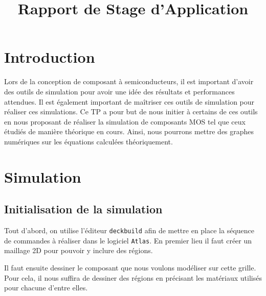 \documentclass[a4paper,11pt]{report}
\title{Rapport de Stage d'Application}
\begin{document}


\chapter{Introduction}
Lors de la conception de composant à semiconducteurs, il est important d'avoir des outils de simulation pour avoir une idée des résultats et performances attendues. Il est également important de maîtriser ces outils de simulation pour réaliser ces simulations. Ce TP a pour but de nous initier à certains de ces outils en nous proposant de réaliser la simulation de composants MOS tel que ceux étudiés de manière théorique en cours. Ainsi, nous pourrons mettre des graphes  numériques sur les équations calculées théoriquement.

\chapter{Simulation}

\section{Initialisation de la simulation}

Tout d'abord, on utilise l'éditeur \texttt{deckbuild} afin de mettre en place la séquence de commandes à réaliser dans le logiciel \texttt{Atlas}. En premier lieu il faut créer un maillage 2D pour pouvoir y inclure des régions.
\vspace{0.3cm}

\noindent{}
\vspace{0.3cm}

Il faut ensuite dessiner le composant que nous voulons modéliser sur cette grille. Pour cela, il nous suffira de dessiner des régions en précisant les matériaux utilisés pour chacune d'entre elles.
\vspace{0.3cm}
\end{document}
